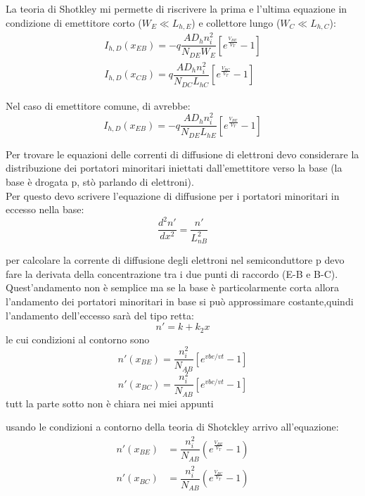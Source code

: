 La teoria di Shotkley mi permette di riscrivere la prima e l'ultima equazione in condizione di emettitore corto ($W_E \ll L_{h,E}$) e collettore lungo ($W_C \ll L_{h,C}$):
\begin{align}
    I_{h,D}(x_{EB})=-q \dfrac{AD_h n_i^2}{N_{DE} W_E} \left[ e^{\frac{V_{BE}}{V_T}}-1\right]\\
    I_{h,D}(x_{CB})=q \dfrac{AD_h n_i^2}{N_{DC} L_{hC}} \left[ e^{\frac{V_{BC}}{V_T}}-1\right]
\end{align}
\begin{exbox}
    Nel caso di emettitore comune, di avrebbe:
    \begin{equation*}
        I_{h,D}(x_{EB})=-q \dfrac{AD_h n_i^2}{N_{DE} L_{hE}} \left[ e^{\frac{V_{BE}}{V_T}}-1\right]
    \end{equation*}
\end{exbox}
Per trovare le equazioni delle correnti di diffusione di elettroni devo considerare la distribuzione dei portatori minoritari iniettati dall'emettitore verso la base (la base è drogata p, stò parlando di elettroni).\\
Per questo devo scrivere l'equazione di diffusione per i portatori minoritari in eccesso nella base:
\begin{equation}
    \dfrac{d^2n'}{dx^2}=\dfrac{n'}{L_{nB}^2}
\end{equation}
\begin{ricevimento}
    per calcolare la corrente di diffusione degli elettroni  nel semiconduttore p devo fare la derivata della concentrazione tra i due punti di raccordo (E-B e B-C). Quest'andamento non è semplice ma se la base è particolarmente corta allora l'andamento dei portatori minoritari in base si può approssimare costante,quindi l'andamento dell'eccesso sarà del tipo retta:
    \begin{equation}
        n'=k+k_2x
    \end{equation}
    le cui condizioni al contorno sono
    \begin{equation}
        n'(x_{BE})=\dfrac{n_i^2}{N_{AB}}[e^{vbe/vt}-1]
    \end{equation}
    \begin{equation}
        n'(x_{BC})=\dfrac{n_i^2}{N_{AB}}[e^{vbc/vt}-1]
    \end{equation}
    tutt la parte sotto non è chiara nei miei appunti
\end{ricevimento}
\noindent\begin{minipage}{0.49\textwidth}
    usando le condizioni a contorno della teoria di Shotckley arrivo all'equazione:
\begin{align}
    n'(x_{BE}) &= \dfrac{n_i^2}{N_{AB}}\left( e^{\frac{V_{BE}}{V_T}} - 1 \right)\\
    n'(x_{BC}) &= \dfrac{n_i^2}{N_{AB}}\left( e^{\frac{V_{BC}}{V_T}} - 1 \right)
\end{align}
\end{minipage}

